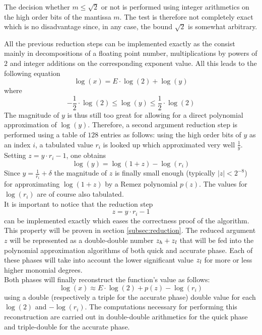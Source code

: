 The decision whether $m \leq \sqrt{2}$ or not is performed using integer arithmetics on 
the high order bits of the mantissa $m$. The test is therefore not completely exact which is no
disadvantage since, in any case, the bound $\sqrt{2}$ is somewhat arbitrary.\par
All the previous reduction steps can be implemented exactly as the consist mainly in decompositions
of a floating point number, multiplications by powers of $2$ and integer additions on the corresponding exponent value.
All this leads to the following equation 
$$\log\left( x \right) = E \cdot \log\left( 2 \right) + \log\left( y \right)$$
where
$$-\frac{1}{2} \cdot \log\left( 2 \right) \leq \log\left( y \right) \leq \frac{1}{2} \cdot \log\left( 2 \right)$$
The magnitude of $y$ is thus still too great for allowing for a direct polynomial approximation of $\log\left(y\right)$.
Therefore, a second argument reduction step is performed using a table of $128$ entries as follows:
using the high order bits of $y$ as an index $i$, a tabulated value $r_i$ is looked up which approximated very well
$\frac{1}{y}$. Setting $z = y \cdot r_i - 1$, one obtains 
$$\log\left( y \right) = \log\left( 1 + z \right) - \log\left( r_i \right)$$
Since $y = \frac{1}{r_i} + \delta$ the magnitude of $z$ is finally
small enough (typically $\left \vert z \right \vert < 2^{-8}$) for
approximating $\log\left(1+z\right)$ by a Remez polynomial
$p\left(z\right)$. The values for $\log\left(r_i\right)$ are of course also tabulated.\\
It is important to notice that the reduction step 
$$z = y \cdot r_i - 1$$ 
can be implemented exactly which eases the correctness proof of the algorithm. This property will be proven in 
section \ref{subsec:reduction}. The reduced argument $z$ will
be represented as a double-double number $z_{\mathit{h}} + z_{\mathit{l}}$ that will be fed into the polynomial approximation 
algorithms of both quick and accurate phase. Each of these phases will take into account the lower significant value 
$z_{\mathit{l}}$ for more or less 
higher monomial degrees.\\
Both phases will finally reconstruct the function's value as follows:
$$\log\left( x \right) \approx E \cdot \log\left( 2 \right) + p\left( z \right) - \log\left( r_i \right)$$
using a double (respectively a triple for the accurate phase) double value for each 
$\log\left( 2 \right)$ and $-\log\left( r_i \right)$. The computations necessary for performing this reconstruction
are carried out in double-double arithmetics for the quick phase and triple-double for the accurate phase.\\~\par
